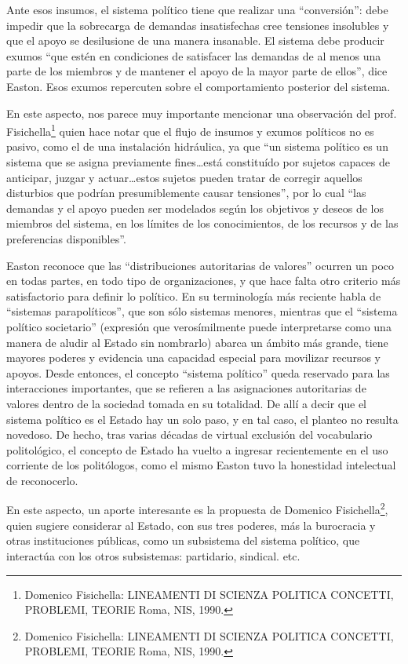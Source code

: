 \documentclass[
]{book}
\begin{document}
Ante esos insumos, el sistema político tiene que realizar una ``conversión'': debe impedir que la sobrecarga de demandas insatisfechas cree tensiones insolubles y que el apoyo se desilusione de una manera insanable. El sistema debe producir exumos ``que estén en condiciones de satisfacer las demandas de al menos una parte de los miembros y de mantener el apoyo de la mayor parte de ellos'', dice Easton. Esos exumos repercuten sobre el comportamiento posterior del sistema.

En este aspecto, nos parece muy importante mencionar una observación del prof. Fisichella\footnote{Domenico Fisichella: LINEAMENTI DI SCIENZA POLITICA CONCETTI, PROBLEMI, TEORIE Roma, NIS, 1990.} quien hace notar que el flujo de insumos y exumos políticos no es pasivo, como el de una instalación hidráulica, ya que ``un sistema político es un sistema que se asigna previamente fines\ldots está constituído por sujetos capaces de anticipar, juzgar y actuar\ldots estos sujetos pueden tratar de corregir aquellos disturbios que podrían presumiblemente causar tensiones'', por lo cual ``las demandas y el apoyo pueden ser modelados según los objetivos y deseos de los miembros del sistema, en los límites de los conocimientos, de los recursos y de las preferencias disponibles''.

Easton reconoce que las ``distribuciones autoritarias de valores'' ocurren un poco en todas partes, en todo tipo de organizaciones, y que hace falta otro criterio más satisfactorio para definir lo político. En su terminología más reciente habla de ``sistemas parapolíticos'', que son sólo sistemas menores, mientras que el ``sistema político societario'' (expresión que verosímilmente puede interpretarse como una manera de aludir al Estado sin nombrarlo) abarca un ámbito más grande, tiene mayores poderes y evidencia una capacidad especial para movilizar recursos y apoyos. Desde entonces, el concepto ``sistema político'' queda reservado para las interacciones importantes, que se refieren a las asignaciones autoritarias de valores dentro de la sociedad tomada en su totalidad. De allí a decir que el sistema político es el Estado hay un solo paso, y en tal caso, el planteo no resulta novedoso. De hecho, tras varias décadas de virtual exclusión del vocabulario politológico, el concepto de Estado ha vuelto a ingresar recientemente en el uso corriente de los politólogos, como el mismo Easton tuvo la honestidad intelectual de reconocerlo.

En este aspecto, un aporte interesante es la propuesta de Domenico Fisichella\footnote{Domenico Fisichella: LINEAMENTI DI SCIENZA POLITICA CONCETTI, PROBLEMI, TEORIE Roma, NIS, 1990.}, quien sugiere considerar al Estado, con sus tres poderes, más la burocracia y otras instituciones públicas, como un subsistema del sistema político, que interactúa con los otros subsistemas: partidario, sindical. etc.
\end{document}
